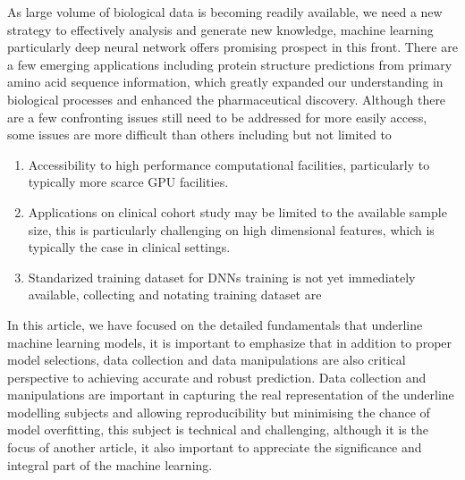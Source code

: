 As large volume of biological data is becoming readily available, we need a new strategy to effectively analysis and generate new knowledge, machine learning particularly deep neural network offers promising prospect in this front. There are a few emerging applications including protein structure predictions from primary amino acid sequence information, which greatly expanded our understanding in biological processes and enhanced the pharmaceutical discovery. Although there are a few confronting issues still need to be addressed for more easily access, some issues are more difficult than others including but not limited to 
\begin{enumerate}
    \item Accessibility to high performance computational facilities, particularly to typically more scarce GPU facilities. 
    \item Applications on clinical cohort study may be limited to the available sample size, this is particularly challenging on high dimensional features, which is typically the case in clinical settings. 
    \item Standarized training dataset for DNNs training is not yet immediately available, collecting and notating training dataset are
\end{enumerate}
\par
In this article, we have focused on the detailed fundamentals that underline machine learning models, it is important to emphasize that in addition to proper model selections, data collection and data manipulations are also critical perspective to achieving accurate and robust prediction. Data collection and manipulations are important in capturing the real representation of the underline modelling subjects and allowing reproducibility but minimising the chance of model overfitting, this subject is technical and challenging, although it is the focus of another article, it also important to appreciate the significance and integral part of the machine learning. 
\par 
